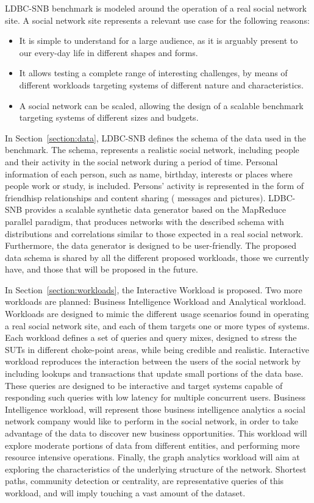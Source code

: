 LDBC-SNB benchmark is modeled around the operation of a real social network
site. A social network site represents a relevant use case for the following
reasons:

\begin{itemize}
    \item It is simple to understand for a large audience, as it is
        arguably present to our every-day life in different shapes and forms.
    \item It allows testing a complete range of interesting
        challenges, by means of different workloads targeting systems of
        different nature and characteristics.
    \item A social network can be scaled, allowing the design of a
        scalable benchmark targeting systems of different sizes and budgets.
\end{itemize}

In Section~\ref{section:data}, LDBC-SNB defines the schema of the data used in
the benchmark. The schema, represents a realistic social network, including
people and their activity in the social network during a period of time.
Personal information of each person, such as name, birthday, interests
or places where people work or study, is included. Persons' activity is
represented in the form of friendhisp relationships and content sharing (\ie
messages and pictures). LDBC-SNB provides a scalable synthetic data generator
based on the MapReduce parallel paradigm, that produces networks with the
described schema with distributions and correlations similar to those expected
in a real social network. Furthermore, the data generator is designed to be
user-friendly. The proposed data schema is shared by all the different proposed
workloads, those we currently have, and those that will be proposed in the future.

In Section~\ref{section:workloads}, the Interactive Workload is proposed.
Two more workloads are planned:  Business Intelligence Workload and
Analytical workload. Workloads are designed to mimic the different usage
scenarios found in operating a real social network site, and each of them
targets one or more types of systems.  Each workload defines a set of queries
and query mixes, designed to stress the SUTs in different choke-point areas,
while being credible and realistic. Interactive workload reproduces the
interaction between the users of the social network by including lookups and
transactions that update small portions of the data base.  These queries are
designed to be interactive and target systems capable of responding such
queries with low latency for multiple concurrent users. Business Intelligence
workload, will represent those business intelligence analytics a social
network company would like to perform in the social network, in order to take
advantage of the data to discover new business opportunities. This workload
will explore moderate portions of data from different entities, and performing more
resource intensive operations. Finally, the graph analytics workload will aim at
exploring the characteristics of the underlying structure of the network. Shortest
paths, community detection or centrality, are representative queries of this workload,
and will imply touching a vast amount of the dataset.


